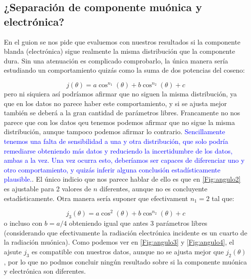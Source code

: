 \documentclass[11pt]{article}
\begin{document}
\subsection{¿Separación de componente muónica y electrónica?}

En el guion se nos pide que evaluemos con nuestros resultados si la componente blanda (electrónica) sigue realmente la misma distribución que la componente dura. Sin una atenuación es complicado comprobarlo, la única manera sería estudiando un comportamiento quizás como la suma de dos potencias del coseno:

\begin{equation}
	j(\theta)=a \cos^{n_1}(\theta)+ b \cos^{n_2}(\theta) + c
\end{equation}
pero ni siquiera así podríamos afirmar que no siguen la misma distribución, ya que en los datos no parece haber este comportamiento, y si se ajusta mejor también se deberá a la gran cantidad de parámetros libres. Francamente no nos parece que con los datos qeu tenemos podemos afirmar que no sigue la misma distribución, aunque tampoco podemos afirmar lo contrario. \textcolor{blue}{Sencillamente tenemos una falta de sensibilidad a una y otra distribución, que solo podría remediarse  obteniendo más datos y reduciendo la incertidumbre de los datos, ambas a la vez. Una vez ocurra esto, deberíamos ser capaces de diferenciar uno y otro comportamiento, y quizás inferir alguna conclusión estadísticamente plausible.}. El único indicio que nos parece hablar de ello es que en \cref{Fig:angulo2} es ajustable para 2 valores de $n$ diferentes, aunque no es concluyente estadísticamente. Otra manera sería suponer que efectivament $n_1=2$ tal que: 

\begin{equation}
	j_{3}(\theta)=a \cos^{2}(\theta)+ b \cos^{n_2}(\theta) + c
\end{equation}
o incluso con $b=a/4$ obteniendo igual que antes 3 parámetros libres (considerando que efectivamente la radiación electrónica incidente es un cuarto de la radiación muónica). Como podemos ver en \cref{Fig:angulo3} y \cref{Fig:angulo4}, el ajsute $j_3$ es compatible con nuestros datos, aunque no se ajusta mejor que $j_2(\theta)$, por lo que no podmos concluir ningún resultado sobre si la componente muónica y electrónica son diferentes.
\end{document}
